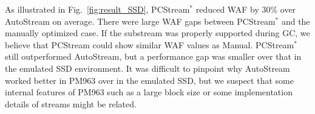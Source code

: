 As illustrated in Fig.~\ref{fig:result_SSD}, {\sf PCStream$^*$} reduced WAF by
30\% over \textsf{AutoStream} on average.  There were large WAF gaps between
\textsf{PCStream$^{*}$} and the manually optimized case.  If the substream was
properly supported during GC, we believe that \textsf{PCStream} could show
similar WAF values as \textsf{Manual}.  \textsf{PCStream$^*$} still
outperformed \textsf{AutoStream}, but a performance gap was smaller over that
in the emulated SSD environment.  It was difficult to pinpoint why
\textsf{AutoStream} worked better in PM963 over in the emulated SSD, but we
suspect that some internal features of PM963 such as a large block size or some
implementation details of streams might be related. 

